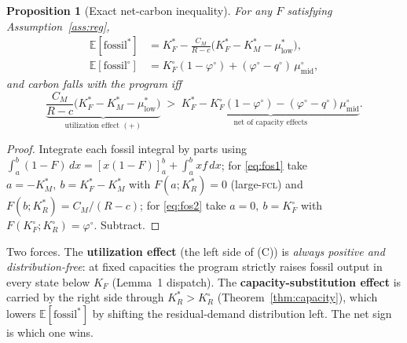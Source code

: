 \documentclass[11pt,reqno]{amsart}
\theoremstyle{plain}
\newtheorem{proposition}{Proposition}
\theoremstyle{definition}
\theoremstyle{remark}
\newcommand{\KF}{K_F}
\newcommand{\KRs}{K_R^{*}}
\newcommand{\KFs}{K_F^{*}}
\newcommand{\KMs}{K_M^{*}}
\newcommand{\KRo}{K_R^{\circ}}
\newcommand{\KFo}{K_F^{\circ}}
\newcommand{\CM}{C_M}
\newcommand{\E}{\mathbb{E}}
\begin{document}
\begin{proposition}[Exact net-carbon inequality]\label{prop:carbon}
For any $F$ satisfying Assumption~\ref{ass:reg},
\begin{align}
  \E[\text{fossil}^{*}] &=\KFs-\tfrac{\CM}{R-c}\big(\KFs-\KMs-\mu^{*}_{\mathrm{low}}\big),
  \label{eq:fos1}\\
  \E[\text{fossil}^{\circ}] &=\KFo(1-\varphi^{\circ})+(\varphi^{\circ}-q^{\circ})\,\mu^{\circ}_{\mathrm{mid}},
  \label{eq:fos2}
\end{align}
and carbon falls with the program iff
\begin{equation}\label{eq:C}
  \underbrace{\frac{\CM}{R-c}\big(\KFs-\KMs-\mu^{*}_{\mathrm{low}}\big)}_{\text{utilization effect }(+)}
  \;>\;
  \underbrace{\KFs-\KFo(1-\varphi^{\circ})-(\varphi^{\circ}-q^{\circ})\mu^{\circ}_{\mathrm{mid}}}_{\text{net of capacity effects}}.
  \tag{C}
\end{equation}
\end{proposition}

\begin{proof}
Integrate each fossil integral by parts using
$\int_a^b(1-F)\,dx=[x(1-F)]_a^b+\int_a^b x f\,dx$; for \eqref{eq:fos1} take
$a=-\KMs,\ b=\KFs-\KMs$ with $F(a;\KRs)=0$ (large-\textsc{fcl}) and
$F(b;\KRs)=\CM/(R-c)$; for \eqref{eq:fos2} take $a=0,\ b=\KFo$ with
$F(\KFo;\KRo)=\varphi^{\circ}$. Subtract.
\end{proof}

Two forces. The \textbf{utilization effect} (the left side of (C)) is
\emph{always positive and distribution-free}: at fixed capacities the program
strictly raises fossil output in every state below $\KF$ (Lemma~1 dispatch).
The \textbf{capacity-substitution effect} is carried by the right side through
$\KRs>\KRo$ (Theorem~\ref{thm:capacity}), which lowers $\E[\text{fossil}^{*}]$ by
shifting the residual-demand distribution left. The net sign is which one wins.
\end{document}
